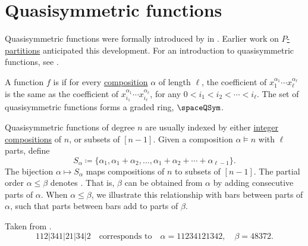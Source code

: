 

\section[quasiSymmetricFunctions]{Quasisymmetric functions}

Quasisymmetric functions were formally introduced by  in
\cite{Gessel1984}.
Earlier work on \hyperref[pPartition]{$P$-partitions} anticipated this
development.
For an introduction to quasisymmetric functions, see \cite{LuotoEtAl2013IntroQSymSchur}.


A function $f$ is \label{quasisymmetricFunctionDefinition}
if for every \hyperref[compositions]{composition} $\alpha$ of length $\ell$,
the coefficient of $x_1^{\alpha_1} \dotsm x_\ell^{\alpha_\ell}$
is the same as the coefficient of
$x_{i_1}^{\alpha_1} \dotsm x_{i_\ell}^{\alpha_\ell}$,
for any $0 \lt i_1 \lt i_2 \lt \dotsb \lt i_{\ell}$.
The set of quasisymmetric functions forms a graded ring, $\spaceQSym$.


Quasisymmetric functions of degree $n$ are usually indexed by either
\hyperref[compositions]{integer compositions} of $n$, or subsets of $[n-1]$.
Given a composition $\alpha \vDash n$ with $\ell$ parts, define
\[
S_\alpha
\coloneqq
\{\alpha_1, \alpha_1+\alpha_2,\dotsc,
\alpha_1+\alpha_2+\dotsb+\alpha_{\ell-1}\}.
\]
The bijection $\alpha \mapsto S_\alpha$ maps compositions of $n$ to subsets of
$[n-1]$.
The partial order $\alpha \leq \beta$ denotes
\label{compositionRefinementOrder}.  That is, $\beta$ can be
obtained from $\alpha$ by adding consecutive parts of $\alpha$.
When $\alpha \leq \beta$, we illustrate this relationship with bars between
parts of $\alpha$, such that parts between bars add to parts of $\beta$.

\begin{example*}
Taken from \cite{AlexanderssonSulzgruber2019}.
\[
112|341|21|34|2
\quad\text{corresponds to}\quad
\alpha = 11234121342,
\quad
\beta = 48372.
\]
\end{example*}


